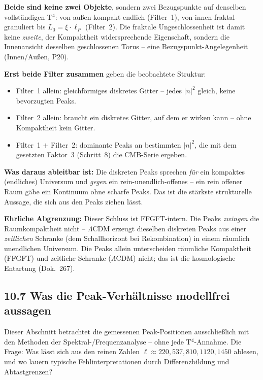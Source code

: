 \textbf{Beide sind keine zwei Objekte}, sondern zwei Bezugspunkte auf
denselben vollständigen T$^4$: von außen kompakt-endlich (Filter~1),
von innen fraktal-granuliert bis $L_0 = \xi\cdot\ell_P$ (Filter~2).
Die fraktale Ungeschlossenheit ist damit keine \emph{zweite}, der
Kompaktheit widersprechende Eigenschaft, sondern die Innenansicht
desselben geschlossenen Torus -- eine Bezugspunkt-Angelegenheit
(Innen/Außen, P20).

\textbf{Erst beide Filter zusammen} geben die beobachtete Struktur:
\begin{itemize}
  \item Filter~1 allein: gleichförmiges diskretes Gitter -- jedes
        $|n|^2$ gleich, keine bevorzugten Peaks.
  \item Filter~2 allein: braucht ein diskretes Gitter, auf dem er
        wirken kann -- ohne Kompaktheit kein Gitter.
  \item Filter~1 $+$ Filter~2: dominante Peaks an bestimmten $|n|^2$,
        die mit dem gesetzten Faktor~3 (Schritt~8) die CMB-Serie ergeben.
\end{itemize}

\textbf{Was daraus ableitbar ist:} Die diskreten Peaks sprechen
\emph{für} ein kompaktes (endliches) Universum und \emph{gegen} ein
rein-unendlich-offenes -- ein rein offener Raum gäbe ein Kontinuum
ohne scharfe Peaks. Das ist die stärkste strukturelle Aussage, die
sich aus den Peaks ziehen lässt.

\textbf{Ehrliche Abgrenzung:} Dieser Schluss ist FFGFT-intern. Die
Peaks \emph{zwingen} die Raumkompaktheit nicht -- $\Lambda$CDM erzeugt
dieselben diskreten Peaks aus einer \emph{zeitlichen} Schranke (dem
Schallhorizont bei Rekombination) in einem räumlich unendlichen
Universum. Die Peaks allein unterscheiden räumliche Kompaktheit
(FFGFT) und zeitliche Schranke ($\Lambda$CDM) nicht; das ist die
kosmologische Entartung (Dok.~267).

\subsection*{10.7 Was die Peak-Verhältnisse modellfrei aussagen}

Dieser Abschnitt betrachtet die gemessenen Peak-Positionen ausschließlich
mit den Methoden der Spektral-/Frequenzanalyse -- ohne jede
T$^4$-Annahme. Die Frage: Was lässt sich aus den reinen Zahlen
$\ell \approx 220, 537, 810, 1120, 1450$ ablesen, und wo lauern
typische Fehlinterpretationen durch Differenzbildung und Abtastgrenzen?

